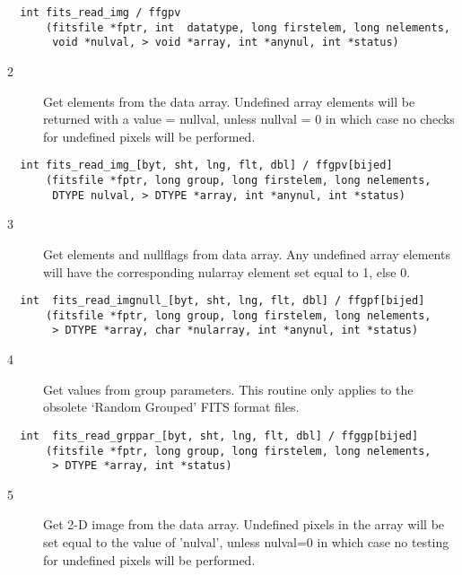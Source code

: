 \begin{verbatim}
  int fits_read_img / ffgpv
      (fitsfile *fptr, int  datatype, long firstelem, long nelements,
       void *nulval, > void *array, int *anynul, int *status)
\end{verbatim}

\begin{description}
\item[2 ] Get elements from the data array.  Undefined array elements will be
    returned with a value = nullval, unless nullval = 0 in which case no
   checks for undefined pixels will be performed.
\end{description}

\begin{verbatim}
  int fits_read_img_[byt, sht, lng, flt, dbl] / ffgpv[bijed]
      (fitsfile *fptr, long group, long firstelem, long nelements,
       DTYPE nulval, > DTYPE *array, int *anynul, int *status)
\end{verbatim}

\begin{description}
\item[3 ] Get elements and nullflags from data array.
    Any undefined array elements will have the corresponding nularray element
   set equal to 1, else 0.
\end{description}

\begin{verbatim}
  int  fits_read_imgnull_[byt, sht, lng, flt, dbl] / ffgpf[bijed]
      (fitsfile *fptr, long group, long firstelem, long nelements,
       > DTYPE *array, char *nularray, int *anynul, int *status)
\end{verbatim}

\begin{description}
\item[4 ] Get values from group parameters.   This routine only applies
   to the obsolete `Random Grouped' FITS format files.
\end{description}

\begin{verbatim}
  int  fits_read_grppar_[byt, sht, lng, flt, dbl] / ffggp[bijed]
      (fitsfile *fptr, long group, long firstelem, long nelements,
       > DTYPE *array, int *status)
\end{verbatim}

\begin{description}
\item[5 ]  Get 2-D image from the data array.  Undefined
     pixels in the array will be set equal to the value of 'nulval',
     unless nulval=0 in which case no testing for undefined pixels will
    be performed.
\end{description}

